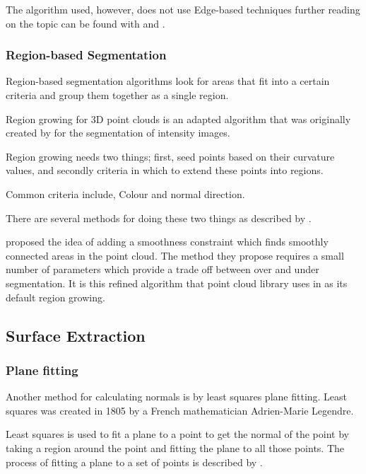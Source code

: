 		The algorithm used, however, does not use Edge-based techniques further reading on the topic can be found with \cite{sappa_fast_2001} and \cite{bhanu_automatic_1986}.
		
		
		\subsubsection{Region-based Segmentation}
		Region-based segmentation algorithms look for areas that fit into a certain criteria and group them together as a single region.
		
		Region growing for 3D point clouds is an adapted algorithm that was originally created by \cite{adams_seeded_1994} for the segmentation of intensity images.
		
		Region growing needs two things; first, seed points based on their curvature values, and secondly criteria in which to extend these points into regions.
		
		Common criteria include, Colour and normal direction.
		
		There are several methods for doing these two things as described by \cite{hoover_experimental_1996}.		
		
		\cite{rabbani_segmentation_2006} proposed the idea of adding a smoothness constraint which finds smoothly connected areas in the point cloud. The method they propose requires a small number of parameters which provide a trade off between over and under segmentation. It is this refined algorithm that point cloud library uses in as its default region growing.
		

		
	
	
	\subsection{Surface Extraction}
		\subsubsection{Plane fitting}
		Another method for calculating normals is by least squares plane fitting. Least squares was created in 1805 by a French mathematician Adrien-Marie Legendre.
		
		Least squares is used to fit a plane to a point to get the normal of the point by taking a region around the point and fitting the plane to all those points. The process of fitting a plane to a set of points is described by \cite{schomaker_fit_1959}.
		
